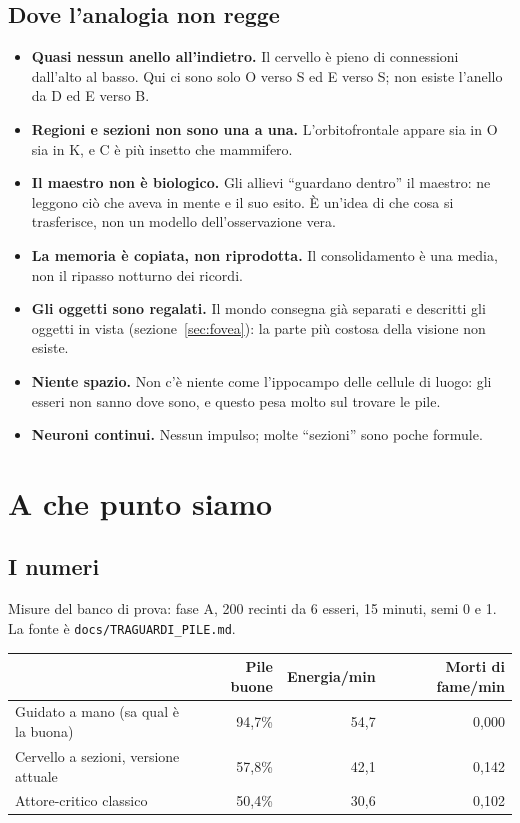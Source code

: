 \documentclass[11pt,a4paper]{article}
\begin{document}
\subsection{Dove l'analogia non regge}

\begin{itemize}
\item \textbf{Quasi nessun anello all'indietro.} Il cervello è pieno di connessioni dall'alto
  al basso. Qui ci sono solo O verso S ed E verso S; non esiste l'anello da D ed E verso B.
\item \textbf{Regioni e sezioni non sono una a una.} L'orbitofrontale appare sia in O sia in
  K, e C è più insetto che mammifero.
\item \textbf{Il maestro non è biologico.} Gli allievi ``guardano dentro'' il maestro: ne
  leggono ciò che aveva in mente e il suo esito. È un'idea di che cosa si trasferisce, non
  un modello dell'osservazione vera.
\item \textbf{La memoria è copiata, non riprodotta.} Il consolidamento è una media, non il
  ripasso notturno dei ricordi.
\item \textbf{Gli oggetti sono regalati.} Il mondo consegna già separati e descritti gli
  oggetti in vista (sezione~\ref{sec:fovea}): la parte più costosa della visione non esiste.
\item \textbf{Niente spazio.} Non c'è niente come l'ippocampo delle cellule di luogo: gli
  esseri non sanno dove sono, e questo pesa molto sul trovare le pile.
\item \textbf{Neuroni continui.} Nessun impulso; molte ``sezioni'' sono poche formule.
\end{itemize}

\section{A che punto siamo}\label{sec:stato}

\subsection{I numeri}

Misure del banco di prova: fase A, 200 recinti da 6 esseri, 15 minuti, semi 0 e 1.
La fonte è \texttt{docs/TRAGUARDI\_PILE.md}.

\begin{center}
\begin{tabular}{lrrr}
\toprule
& \textbf{Pile buone} & \textbf{Energia/min} & \textbf{Morti di fame/min} \\
\midrule
Guidato a mano (sa qual è la buona) & 94,7\% & 54,7 & 0,000 \\
Cervello a sezioni, versione attuale & 57,8\% & 42,1 & 0,142 \\
Attore-critico classico & 50,4\% & 30,6 & 0,102 \\
\bottomrule
\end{tabular}
\end{center}
\end{document}
